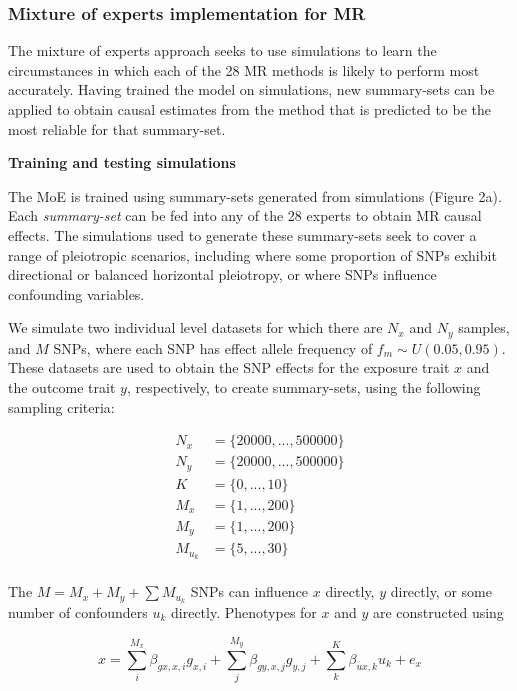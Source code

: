 \documentclass[]{article}
\begin{document}
\subsubsection{Mixture of experts implementation for
MR}\label{mixture-of-experts-implementation-for-mr}

The mixture of experts approach seeks to use simulations to learn the
circumstances in which each of the 28 MR methods is likely to perform
most accurately. Having trained the model on simulations, new
summary-sets can be applied to obtain causal estimates from the method
that is predicted to be the most reliable for that summary-set.

\textbf{Training and testing simulations}

The MoE is trained using summary-sets generated from simulations (Figure
2a). Each \emph{summary-set} can be fed into any of the 28 experts to
obtain MR causal effects. The simulations used to generate these
summary-sets seek to cover a range of pleiotropic scenarios, including
where some proportion of SNPs exhibit directional or balanced horizontal
pleiotropy, or where SNPs influence confounding variables.

We simulate two individual level datasets for which there are \(N_x\)
and \(N_y\) samples, and \(M\) SNPs, where each SNP has effect allele
frequency of \(f_m \sim U(0.05, 0.95)\). These datasets are used to
obtain the SNP effects for the exposure trait \(x\) and the outcome
trait \(y\), respectively, to create summary-sets, using the following
sampling criteria:

\[
\begin{aligned}
N_x & = \{20000, ..., 500000\} \\
N_y & = \{20000, ..., 500000\} \\
K & = \{0, ..., 10\} \\
M_x & = \{1, ..., 200\} \\
M_y & = \{1, ..., 200\} \\
M_{u_k} & = \{5,..., 30\} \\
\end{aligned}
\]

The \(M = M_x + M_y + \sum{M_{u_k}}\) SNPs can influence \(x\) directly,
\(y\) directly, or some number of confounders \(u_{k}\) directly.
Phenotypes for \(x\) and \(y\) are constructed using

\[
x = \sum^{M_x}_{i}{\beta_{gx,x,i}g_{x,i}} + \sum^{M_y}_{j}{\beta_{gy,x,j}g_{y,j}} + \sum^{K}_{k}{\beta_{ux,k} u_{k}} + e_{x}
\]
\end{document}
